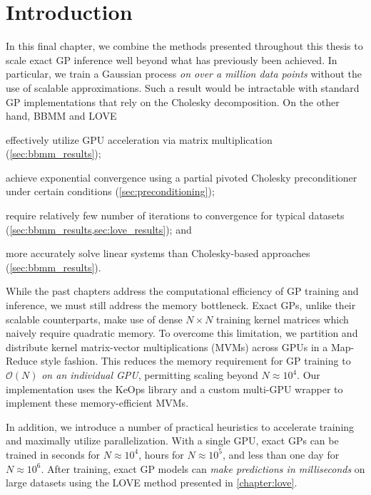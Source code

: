 \section{Introduction}


In this final chapter, we combine the methods presented throughout this thesis to scale exact GP inference well beyond what has previously been achieved.
In particular, we train a Gaussian process \emph{on over a million data points} without the use of scalable approximations.
Such a result would be intractable with standard GP implementations that rely on the Cholesky decomposition.
On the other hand, BBMM and LOVE
\begin{enumerate*}
  \item effectively utilize GPU acceleration via matrix multiplication (\cref{sec:bbmm_results});
  \item achieve exponential convergence using a partial pivoted Cholesky preconditioner under certain conditions (\cref{sec:preconditioning});
  \item require relatively few number of iterations to convergence for typical datasets (\cref{sec:bbmm_results,sec:love_results}); and
  \item more accurately solve linear systems than Cholesky-based approaches (\cref{sec:bbmm_results}).
\end{enumerate*}

While the past chapters address the computational efficiency of GP training and inference, we must still address the memory bottleneck.
Exact GPs, unlike their scalable counterparts, make use of dense $N \times N$ training kernel matrices which naively require quadratic memory.
To overcome this limitation, we partition and distribute kernel matrix-vector multiplications (MVMs) across GPUs in a Map-Reduce style fashion.
This reduces the memory requirement for GP training to $\mathcal{O}(N)$ \emph{on an individual GPU}, permitting scaling beyond $N\approx 10^4$.
Our implementation uses the KeOps library \cite{charlier2020kernel} and a custom multi-GPU wrapper to implement these memory-efficient MVMs.

In addition, we introduce a number of practical heuristics to accelerate training and maximally utilize parallelization.
With a single GPU, exact GPs can be trained in seconds for $N \approx 10^4$, hours for $N \approx 10^5$, and less than one day for $N \approx 10^6$.
After training, exact GP models can \emph{make predictions in milliseconds} on large datasets using the LOVE method presented in \cref{chapter:love}.




